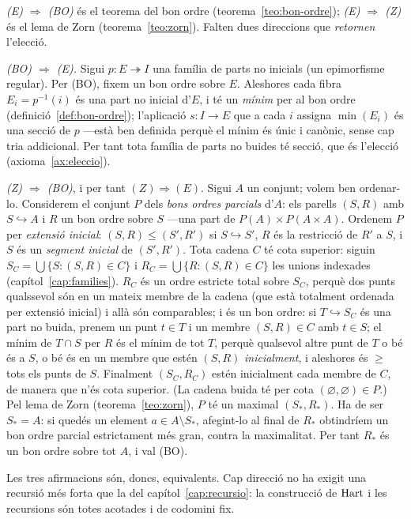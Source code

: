\begin{prova}
\emph{(E) \(\Rightarrow\) (BO)} és el teorema del bon ordre
(teorema~\ref{teo:bon-ordre}); \emph{(E) \(\Rightarrow\) (Z)} és el lema de
Zorn (teorema~\ref{teo:zorn}). Falten dues direccions que \emph{retornen}
l'elecció.

\emph{(BO) \(\Rightarrow\) (E).} Sigui \(p\colon E\twoheadrightarrow I\) una
família de parts no inicials (un epimorfisme regular). Per (BO), fixem un bon
ordre sobre \(E\). Aleshores cada fibra \(E_i=p^{-1}(i)\) és una part no
inicial d'\(E\), i té un \emph{mínim} per al bon ordre
(definició~\ref{def:bon-ordre}); l'aplicació \(s\colon I\to E\) que a cada
\(i\) assigna \(\min(E_i)\) és una secció de \(p\) ---està ben definida
perquè el mínim és únic i canònic, sense cap tria addicional. Per tant tota
família de parts no buides té secció, que és l'elecció (axioma~\ref{ax:eleccio}).

\emph{(Z) \(\Rightarrow\) (BO)}, i per tant \((Z)\Rightarrow(E)\). Sigui \(A\)
un conjunt; volem ben ordenar-lo. Considerem el conjunt \(P\) dels
\emph{bons ordres parcials} d'\(A\): els parells \((S,R)\) amb
\(S\hookrightarrow A\) i \(R\) un bon ordre sobre \(S\) ---una part de
\(P(A)\times P(A\times A)\). Ordenem \(P\) per \emph{extensió inicial}:
\((S,R)\le(S',R')\) si \(S\hookrightarrow S'\), \(R\) és la restricció de
\(R'\) a \(S\), i \(S\) és un \emph{segment inicial} de \((S',R')\). Tota cadena \(C\) té cota superior: siguin
\(S_{C}=\bigcup\{S:(S,R)\in C\}\) i \(R_{C}=\bigcup\{R:(S,R)\in C\}\) les
unions indexades (capítol~\ref{cap:families}). \(R_{C}\) és un ordre
estricte total sobre \(S_{C}\), perquè dos punts qualssevol són en un mateix
membre de la cadena (que està totalment ordenada per extensió inicial) i
allà són comparables; i és un bon ordre: si \(T\hookrightarrow S_{C}\) és
una part no buida, prenem un punt \(t\in T\) i un membre \((S,R)\in C\) amb
\(t\in S\); el mínim de \(T\cap S\) per \(R\) és el mínim de tot \(T\),
perquè qualsevol altre punt de \(T\) o bé és a \(S\), o bé és en un membre
que estén \((S,R)\) \emph{inicialment}, i aleshores és \(\ge\) tots els
punts de \(S\). Finalment \((S_{C},R_{C})\) estén inicialment cada membre
de \(C\), de manera que n'és cota superior. (La cadena buida té per cota
\((\varnothing,\varnothing)\in P\).) Pel lema de Zorn
(teorema~\ref{teo:zorn}), \(P\) té un maximal \((S_{*},R_{*})\). Ha de ser
\(S_{*}=A\): si quedés un element \(a\in A\setminus S_{*}\), afegint-lo al
final de \(R_{*}\) obtindríem un bon ordre parcial estrictament més gran,
contra la maximalitat. Per tant \(R_{*}\) és un bon ordre sobre tot \(A\), i
val (BO).

Les tres afirmacions són, doncs, equivalents. Cap direcció no ha exigit una
recursió més forta que la del capítol~\ref{cap:recursio}: la construcció de
\(\operatorname{Hart}\) i les recursions són totes acotades i de codomini fix.
\end{prova}

